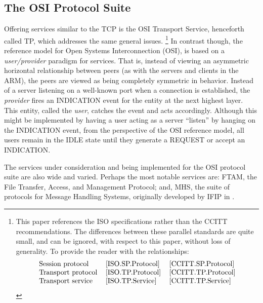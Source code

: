 \subsection	{The OSI Protocol Suite}
Offering services similar to the TCP is the OSI Transport
Service\cite{ISO.TP.Service},
henceforth called TP,
which addresses the same general issues.%
\footnote{This paper references the ISO specifications rather than
the CCITT recommendations.
The differences between these parallel standards are quite small,
and can be ignored, with respect to this paper, without loss of generality.
To provide the reader with the relationships:
\[\begin{tabular}{lll}
	Session protocol&	\cite{ISO.SP.Protocol}&
						\cite{CCITT.SP.Protocol}\\
	Transport protocol&	\cite{ISO.TP.Protocol}&
						\cite{CCITT.TP.Protocol}\\
	Transport service&	\cite{ISO.TP.Service}&
						\cite{CCITT.TP.Service}
\end{tabular}\]}
In contrast though,
the reference model for Open Systems Interconnection (OSI)\cite{OSI},
is based on a {\em user/provider\/} paradigm for services.
That is,
instead of viewing an asymmetric horizontal relationship between peers
(as with the servers and clients in the ARM),
the peers are viewed as being completely symmetric in behavior.
Instead of a server listening on a well-known port
when a connection is established,
the {\em provider\/} fires an {\sf INDICATION\/} event for the entity at the
next highest layer.
This entity, called the {\em user}, catches the event and acts accordingly.
Although this might be implemented by having a user acting as a server
``listen'' by hanging on the {\sf INDICATION\/} event,
from the perspective of the OSI reference model,
all users remain in the {\sf IDLE\/} state until they generate a
{\sf REQUEST\/} or accept an {\sf INDICATION}.

The services under consideration and being implemented for the OSI protocol
suite are also wide and varied.
Perhaps the most notable services are:
FTAM\cite{ISO.FTAM}, the File Transfer, Access, and Management Protocol;
and,
MHS\cite{MHS}, the suite of protocols for Message Handling Systems,
originally developed by IFIP in {}.

